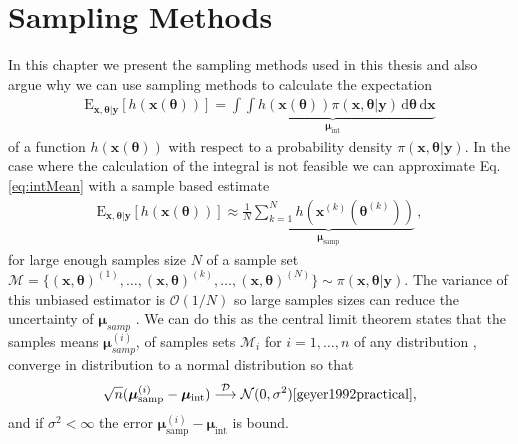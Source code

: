 \section{Sampling Methods}
In this chapter we present the sampling methods used in this thesis and also argue why we can use sampling methods to calculate the expectation
\begin{align}
	\label{eq:intMean}
	\text{E}_{\bm{x},\bm{\theta}|\bm{y}} [h(\bm{x}( \bm{\theta}))] = \underbrace{ \int \int h(\bm{x}(\bm{\theta})) \pi(\bm{x},\bm{\theta}|\bm{y}) \, \text{d} \bm{\theta} \, \text{d} \bm{x} }_{\bm{\mu}_{\text{int}}} 
\end{align}
of a function  $h(\bm{x}(\bm{\theta}))$ with respect to a probability density $\pi( \bm{x},\bm{\theta}|\bm{y})$.
In the case where the calculation of the integral is not feasible we can approximate Eq. \ref{eq:intMean} with a sample based estimate
\begin{align}
	\label{eq:sampMean}
	\text{E}_{\bm{x},\bm{\theta}|\bm{y}} [h(\bm{x}( \bm{\theta}))] \approx \underbrace{ \frac{1}{N} \sum_{k=1}^{N} h(\bm{x}^{(k)}(\bm{\theta}^{(k)}))  }_{\bm{\mu}_{\text{samp}}} \, ,
\end{align}
for large enough samples size $N$ of a sample set $\mathcal{M} = \{  (\bm{x}, \bm{\theta} )^{(1)}, \dots, (\bm{x}, \bm{\theta} )^{(k)} , \dots,  (\bm{x}, \bm{\theta})^{(N)}  \} \sim \pi(\bm{x},\bm{\theta}| \bm{y}) $.
The variance of this unbiased estimator is $\mathcal{O}(1/N)$ so large samples sizes can reduce the uncertainty of $\bm{\mu}_{samp}$ \cite{roberts2004general}.
We can do this as the central limit theorem states that the samples means $ \bm{\mu}^{(i)}_{samp} $, of samples sets $\mathcal{M}_i$ for $i = 1, \dots, n$ of any distribution , converge in distribution to a normal distribution so that
\begin{align}
	 \sqrt{n} (\bm{\mu}^{(i)}_{\text{samp}} -  \bm{\mu}_{\text{int}} ) \overset{\mathcal{D}}{\longrightarrow} \mathcal{N} (0,\sigma^2) \text{\cite{geyer1992practical}},
\end{align}
and if $\sigma^2 < \infty$ the error $\bm{\mu}^{(i)}_{\text{samp}} -  \bm{\mu}_{\text{int}} $ is bound.

